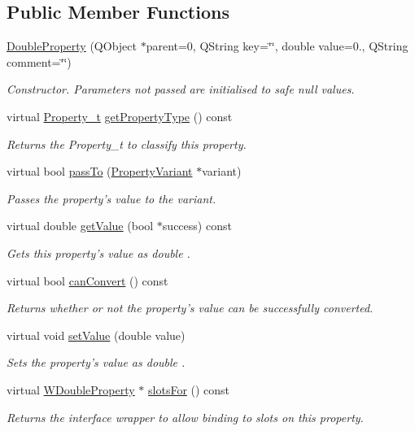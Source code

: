\subsection*{Public Member Functions}
\begin{DoxyCompactItemize}
\item 
\hyperlink{class_double_property_ad6db31eafe29ec0337a91b297b5648fa}{Double\-Property} (Q\-Object $\ast$parent=0, Q\-String key=\char`\"{}\char`\"{}, double value=0., Q\-String comment=\char`\"{}\char`\"{})
\begin{DoxyCompactList}\small\item\em Constructor. Parameters not passed are initialised to safe null values. \end{DoxyCompactList}\item 
virtual \hyperlink{group___property_classes_ga38f1ccddda12c7cb50b868c9f789ee37}{Property\-\_\-t} \hyperlink{class_double_property_a161c45cff47e246a6d27133562af064d}{get\-Property\-Type} () const 
\begin{DoxyCompactList}\small\item\em Returns the Property\-\_\-t to classify this property. \end{DoxyCompactList}\item 
virtual bool \hyperlink{class_double_property_a1c82626c933039cb28619e3723f16e6c}{pass\-To} (\hyperlink{class_property_variant}{Property\-Variant} $\ast$variant)
\begin{DoxyCompactList}\small\item\em Passes the property's value to the variant. \end{DoxyCompactList}\item 
virtual double \hyperlink{class_double_property_a9e196465f85c5fba581dc207dfd60eee}{get\-Value} (bool $\ast$success) const 
\begin{DoxyCompactList}\small\item\em Gets this property's value as double . \end{DoxyCompactList}\item 
virtual bool \hyperlink{class_double_property_a9ce3240555af31c5d4fbe9be33624637}{can\-Convert} () const 
\begin{DoxyCompactList}\small\item\em Returns whether or not the property's value can be successfully converted. \end{DoxyCompactList}\item 
virtual void \hyperlink{class_double_property_a1ae2a71c28ab126ac5eeceffdcdf4226}{set\-Value} (double value)
\begin{DoxyCompactList}\small\item\em Sets the property's value as double . \end{DoxyCompactList}\item 
virtual \hyperlink{class_w_double_property}{W\-Double\-Property} $\ast$ \hyperlink{class_double_property_a383b82607989d0a1abfd778ed7b30803}{slots\-For} () const 
\begin{DoxyCompactList}\small\item\em Returns the interface wrapper to allow binding to slots on this property. \end{DoxyCompactList}\end{DoxyCompactItemize}

